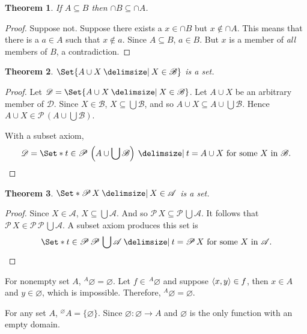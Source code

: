 \documentclass[12pt]{article}
\theoremstyle{plain}
\newtheorem{thm}{Theorem}[section]
\theoremstyle{remark}
\theoremstyle{definition}
\theoremstyle{remark}
\newcommand{\powerset}{\mathscr{P}\,}
\providecommand\st{}
\newcommand\SetSymbol[1][]{%
  \nonscript\:#1\vert%
  \allowbreak%
  \nonscript\:
\mathopen{}}
\DeclarePairedDelimiter{\ang}{\langle}{\rangle}
\renewcommand\st{\SetSymbol[\delimsize]}
\begin{document}
\begin{thm}
  If $A \subseteq B$ then $\cap B \subseteq \cap A$.
\end{thm}
\begin{proof}
  Suppose not. Suppose there exists a $x \in \cap B$ but $x \not\in \cap A$. This means that there is a $a \in A$ such that $x \not\in a$. Since $A \subseteq B$, $a \in B$. But $x$ is a member of \textit{all} members of $B$, a contradiction.
\end{proof}

\begin{thm}
  $\Set{A \cup X \st X \in \mathscr{B}}$ is a set.
\end{thm}
\begin{proof}
  Let $\mathscr{D} = \Set{A \cup X \st X \in \mathscr{B}}$. Let $A \cup X$ be an arbitrary member of $\mathscr{D}$. Since $X \in \mathscr{B}$, $X \subseteq \bigcup \mathscr{B}$, and so $A \cup X \subseteq A \cup \bigcup \mathscr{B}$. Hence $A \cup X \in \powerset\left(A \cup \bigcup  \mathscr{B}\right)$.

  With a subset axiom,
  \[
    \mathscr{D} = \Set*{t \in \powerset\left(A \cup \bigcup  \mathscr{B}\right) \st t = A \cup X \ \text{for some $X$ in $\mathscr{B}$}}.
  \]
\end{proof}

\begin{thm}
  $\Set*{\powerset X \st X \in \mathscr{A}}$ is a set.
\end{thm}
\begin{proof}
  Since $X \in \mathscr{A}$, $X \subseteq \bigcup  \mathscr{A}$. And so $\powerset X \subseteq \powerset \bigcup  \mathscr{A}$. It follows that $\powerset X \in \powerset \powerset \bigcup  \mathscr{A}$. A subset axiom produces this set is
  \[
    \Set*{t \in \powerset \powerset \bigcup  \mathscr{A} \st t = \powerset X\ \text{for some $X$ in $\mathscr{A}$}}.
  \]
\end{proof}

\begin{thmproof}{}
  {For nonempty set $A$, $^{A}\varnothing = \varnothing$.}
  {Let $f \in\, ^{A} \varnothing$ and suppose $\ang{x, y} \in f$, then $x \in A$ and $y \in \varnothing$, which is impossible. Therefore, $^{A} \varnothing = \varnothing$.}
\end{thmproof}

\begin{thmproof}{}
  {For any set $A$, $^{\varnothing} A = \{\varnothing\}$.}
  {Since $\varnothing : \varnothing \rightarrow A$ and $\varnothing$ is the only function with an empty domain.}
\end{thmproof}
\end{document}
